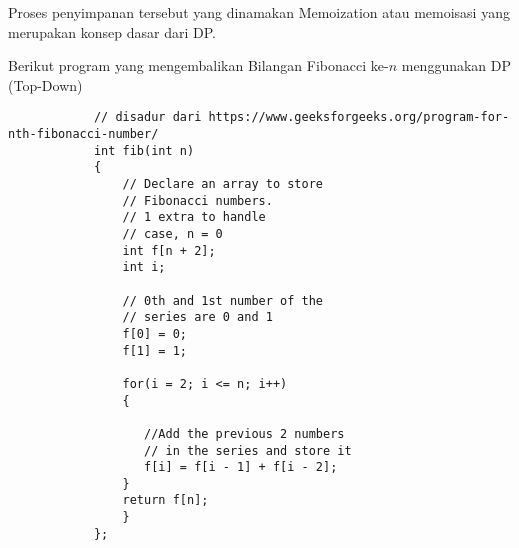 		    Proses penyimpanan tersebut yang dinamakan Memoization atau memoisasi yang merupakan konsep dasar dari DP.
		    
		    Berikut program yang mengembalikan Bilangan Fibonacci ke-$n$ menggunakan DP (Top-Down)
		    \begin{lstlisting}
		    // disadur dari https://www.geeksforgeeks.org/program-for-nth-fibonacci-number/
		    int fib(int n)
		    {
		        // Declare an array to store
		        // Fibonacci numbers.
		        // 1 extra to handle
		        // case, n = 0
		        int f[n + 2];
		        int i;
		     
		        // 0th and 1st number of the
		        // series are 0 and 1
		        f[0] = 0;
		        f[1] = 1;
		     
		        for(i = 2; i <= n; i++)
		        {
		             
		           //Add the previous 2 numbers
		           // in the series and store it
		           f[i] = f[i - 1] + f[i - 2];
		        }
		        return f[n];
		        }
		    };
		    \end{lstlisting}
		    
		    \newpage
